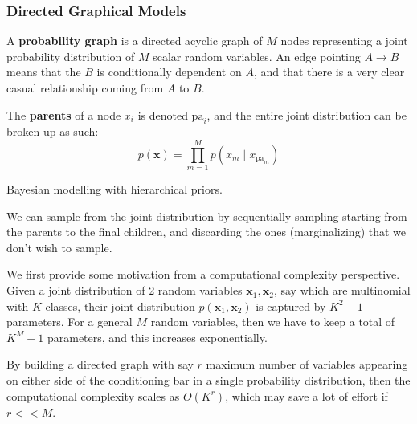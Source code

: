 \documentclass{article}
\begin{document}
    \subsubsection{Directed Graphical Models}

      \begin{definition}  
      A \textbf{probability graph} is a directed acyclic graph of $M$ nodes representing a joint probability distribution of $M$ scalar random variables. An edge pointing $A \rightarrow B$ means that the $B$ is conditionally dependent on $A$, and that there is a very clear casual relationship coming from $A$ to $B$. 
      \begin{center}

      \end{center}
      The \textbf{parents} of a node $x_i$ is denoted $\mathrm{pa}_i$, and the entire joint distribution can be broken up as such: 
      \[p(\mathbf{x}) = \prod_{m=1}^M p(x_m \mid x_{\mathrm{pa}_m})\]
      \end{definition}


      \begin{example}

      \end{example} 


      Bayesian modelling with hierarchical priors. 

      \begin{definition} 
      We can sample from the joint distribution by sequentially sampling starting from the parents to the final children, and discarding the ones (marginalizing) that we don't wish to sample. 
      \end{definition}


      \begin{example}
      We first provide some motivation from a computational complexity perspective. Given a joint distribution of 2 random variables $\mathbf{x}_1, \mathbf{x}_2$, say which are multinomial with $K$ classes, their joint distribution $p(\mathbf{x}_1, \mathbf{x}_2)$ is captured by $K^2 - 1$ parameters. For a general $M$ random variables, then we have to keep a total of $K^M - 1$ parameters, and this increases exponentially. 
      \begin{center}

      \end{center}
      By building a directed graph with say $r$ maximum number of variables appearing on either side of the conditioning bar in a single probability distribution, then the computational complexity scales as $O(K^r)$, which may save a lot of effort if $r << M$. 
      \end{example}
\end{document}
